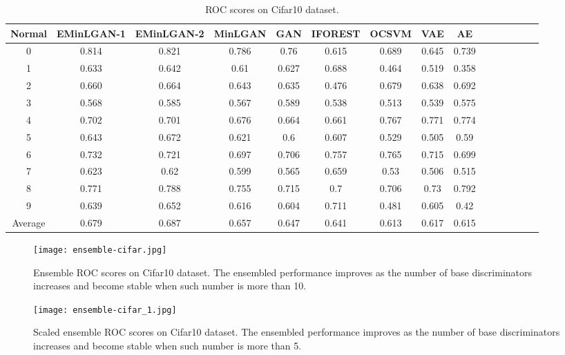 \documentclass[a4paper,conference]{IEEEtran}
\begin{document}
\begin{table*}[t]
\setlength{\abovecaptionskip}{0pt}
\setlength{\belowcaptionskip}{20pt}
\caption{ROC scores on Cifar10 dataset.\label{cifar10table}}
\center
\begin{tabular}{ccccccccccccccc}
\hline
{Normal}&{EMinLGAN-1}& {EMinLGAN-2}&{MinLGAN} &{GAN}&{IFOREST} &{OCSVM} & {VAE} & {AE}\\
\hline

 0& 0.814&0.821&0.786&  0.76&  0.615&  0.689& 0.645 &0.739  \\
\hline
 1& 0.633& 0.642&0.61&  0.627& 0.688 &  0.464& 0.519 &0.358  \\
\hline
 2& 0.660& 0.664&0.643& 0.635& 0.476&  0.679& 0.638 &0.692  \\
\hline
 3& 0.568& 0.585&0.567& 0.589& 0.538&    0.513& 0.539 &0.575  \\
\hline
 4& 0.702&0.701&0.676& 0.664& 0.661&    0.767& 0.771 &0.774  \\
\hline
 5& 0.643&0.672&0.621&0.6&  0.607& 0.529& 0.505 &0.59  \\
\hline
 6& 0.732&0.721&0.697&0.706& 0.757 &  0.765& 0.715 &0.699  \\
\hline
 7& 0.623&0.62&0.599&0.565&  0.659&   0.53& 0.506 &0.515  \\
\hline
 8& 0.771&0.788&0.755&0.715&  0.7&   0.706& 0.73 &0.792  \\
\hline
 9& 0.639&0.652&0.616&0.604&  0.711&  0.481& 0.605 &0.42  \\
\hline
 Average&  0.679 &0.687&0.657&0.647& 0.641&  0.613& 0.617 &0.615 \\
\hline
\end{tabular}

\end{table*}
%
\begin{figure}[h]
\center
\texttt{[image: ensemble-cifar.jpg]}
\caption{ Ensemble ROC scores on Cifar10 dataset\label{cifar-curve}. The ensembled performance improves as the number of base discriminators increases and become stable when such number is more than 10.}
\setlength{\belowcaptionskip}{-0.2cm}
\end{figure}
\begin{figure}[h]
\center
\texttt{[image: ensemble-cifar\_1.jpg]}
\setlength{\belowcaptionskip}{-0.3cm}
\caption{Scaled ensemble ROC scores on Cifar10 dataset\label{cifar-distribution}. The ensembled performance improves as the number of base discriminators increases and become stable when such number is more than 5.}


\end{figure}
\end{document}
